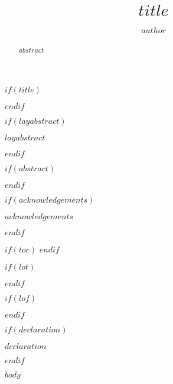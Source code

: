 \documentclass[12pt,twoside]{Mactemplate}
\title{$title$}
\author{$author$}
\begin{document}
\frontmatter %
$if(title)$
  \maketitle
$endif$


$if(layabstract)$
  \begin{layabstract}
    $layabstract$
    \thispagestyle{plain}
  \end{layabstract}
$endif$

$if(abstract)$
  \begin{abstract}
    $abstract$
    \thispagestyle{plain}
  \end{abstract}
$endif$

$if(acknowledgements)$
  \begin{acknowledgements}
    $acknowledgements$
    \thispagestyle{plain}
  \end{acknowledgements}
$endif$

$if(toc)$
  \hypersetup{linkcolor=$if(toccolor)$$toccolor$$else$black$endif$}
  \setcounter{tocdepth}{$toc-depth$}
  \tableofcontents
  \thispagestyle{plain}
$endif$

$if(lot)$
  \listoftables
  \thispagestyle{plain}
$endif$

$if(lof)$
  \listoffigures
  \thispagestyle{plain}
$endif$

$if(declaration)$
  \begin{declaration}
    $declaration$
    \thispagestyle{plain}
  \end{declaration}
$endif$



\mainmatter %

$body$


\end{document}

